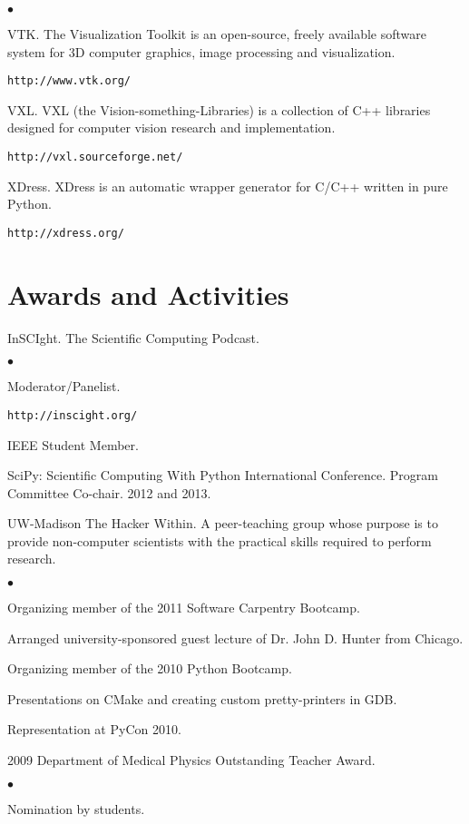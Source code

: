\documentclass[margin,line]{res}
\newenvironment{list2}{
  \begin{list}{$\bullet$}{%
      \setlength{\itemsep}{0in}
      \setlength{\parsep}{0in} \setlength{\parskip}{0in}
      \setlength{\topsep}{0in} \setlength{\partopsep}{0in} 
      \setlength{\leftmargin}{0.2in}}}{\end{list}}
\begin{document}
\begin{resume}
\begin{list2}
\item VTK.  The Visualization Toolkit is an open-source, freely available
  software system for 3D computer graphics, image processing and visualization.
  \begin{verbatim}http://www.vtk.org/\end{verbatim}
\item VXL.  VXL (the Vision-something-Libraries) is a collection of C++
  libraries designed for computer vision research and implementation.
  \begin{verbatim}http://vxl.sourceforge.net/\end{verbatim}
\item XDress.  XDress is an automatic wrapper generator for C/C++ written in
  pure Python.
  \begin{verbatim}http://xdress.org/\end{verbatim}
\end{list2}

\section{\sc Awards and Activities}
InSCIght.  The Scientific Computing Podcast.
\begin{list2}
\item Moderator/Panelist.
\item \verb#http://inscight.org/#
\end{list2}

IEEE Student Member.

SciPy: Scientific Computing With Python International Conference.  Program
Committee Co-chair.  2012 and 2013.

UW-Madison The Hacker Within.  A peer-teaching group whose purpose is to provide
non-computer scientists with the practical skills required to perform research.
\begin{list2}
\item Organizing member of the 2011 Software Carpentry Bootcamp.
\item Arranged university-sponsored guest lecture of Dr. John D. Hunter from Chicago.
\item Organizing member of the 2010 Python Bootcamp.
\item Presentations on CMake and creating custom pretty-printers in GDB.
\item Representation at PyCon 2010.
\end{list2}

2009 Department of Medical Physics Outstanding Teacher Award.
\begin{list2}
\item  Nomination by students.
\end{list2}


\end{resume}
\end{document}
